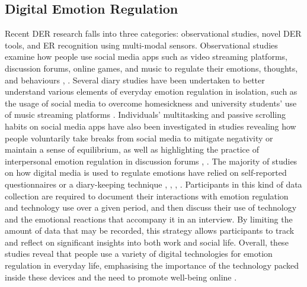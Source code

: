 \documentclass[acmtog]{acmart}
\begin{document}
\subsection{Digital Emotion Regulation}
Recent DER research falls into three categories: observational studies, novel DER tools, and ER recognition using multi-modal sensors. Observational studies examine how people use social media apps such as video streaming platforms, discussion forums, online games, and music to regulate their emotions, thoughts, and behaviours \cite{smith2022digital}, \cite{shen2020video}. Several diary studies have been undertaken to better understand various elements of everyday emotion regulation in isolation, such as the usage of social media to overcome homesickness and university students' use of music streaming platforms \cite{wadley2019use}. Individuals' multitasking and passive scrolling habits on social media apps have also been investigated in studies revealing how people voluntarily take breaks from social media to mitigate negativity or maintain a sense of equilibrium, as well as highlighting the practice of interpersonal emotion regulation in discussion forums \cite{hossain2022motivational}, \cite{lukoff2018makes}. The majority of studies on how digital media is used to regulate emotions have relied on self-reported questionnaires or a diary-keeping technique \cite{smith2022digital}, \cite{shen2020video}, \cite{tag2022impact}, \cite{wadley2019use}. Participants in this kind of data collection are required to document their interactions with emotion regulation and technology use over a given period, and then discuss their use of technology and the emotional reactions that accompany it in an interview. By limiting the amount of data that may be recorded, this strategy allows participants to track and reflect on significant insights into both work and social life. Overall, these studies reveal that people use a variety of digital technologies for emotion regulation in everyday life, emphasising the importance of the technology packed inside these devices and the need to promote well-being online \cite{wadley2020digital}.
\end{document}
